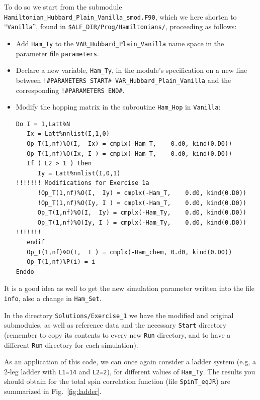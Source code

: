 \documentclass[10pt,modern]{scrartcl}
\numberwithin{exerciseitem}{exercise} %
\begin{document}
To do so we start from the submodule \texttt{Hamiltonian\_Hubbard\_Plain\_Vanilla\_smod.F90}, which we here shorten to ``\texttt{Vanilla}'', found in \texttt{\$ALF\_DIR/Prog/Hamiltonians/}, proceeding as follows: 
\begin{itemize}
	\item Add \texttt{Ham\_Ty} to the \texttt{VAR\_Hubbard\_Plain\_Vanilla} name space in the parameter file \texttt{parameters}.
	\item Declare a new variable, \texttt{Ham\_Ty}, in the module's specification on a new line between \verb|!#PARAMETERS START# VAR_Hubbard_Plain_Vanilla| and the corresponding \verb|!#PARAMETERS END#|.
	\item Modify the hopping matrix in the subroutine \texttt{Ham\_Hop} in \texttt{Vanilla}:
\begin{lstlisting}[style=fortran]
Do I = 1,Latt%N
   Ix = Latt%nnlist(I,1,0)
   Op_T(1,nf)%O(I,  Ix) = cmplx(-Ham_T,    0.d0, kind(0.D0))
   Op_T(1,nf)%O(Ix, I ) = cmplx(-Ham_T,    0.d0, kind(0.D0))
   If ( L2 > 1 ) then
      Iy = Latt%nnlist(I,0,1)
!!!!!!! Modifications for Exercise 1a
      !Op_T(1,nf)%O(I,  Iy) = cmplx(-Ham_T,    0.d0, kind(0.D0))
      !Op_T(1,nf)%O(Iy, I ) = cmplx(-Ham_T,    0.d0, kind(0.D0))
      Op_T(1,nf)%O(I,  Iy) = cmplx(-Ham_Ty,    0.d0, kind(0.D0))
      Op_T(1,nf)%O(Iy, I ) = cmplx(-Ham_Ty,    0.d0, kind(0.D0))
!!!!!!!
   endif
   Op_T(1,nf)%O(I,  I ) = cmplx(-Ham_chem, 0.d0, kind(0.D0))
   Op_T(1,nf)%P(i) = i 
Enddo
\end{lstlisting} 
\end{itemize}
It is a good idea as well to get the new simulation parameter written into the file \texttt{info}, also a change in \texttt{Ham\_Set}.

In the directory \texttt{Solutions/Exercise\_1} we have the modified and original submodules, as well as reference data and the necessary \texttt{Start} directory (remember to copy its contents to every new \texttt{Run} directory, and to have a different \texttt{Run} directory for each simulation).

As an application of this code, we can once again consider a ladder system (e.g, a 2-leg ladder with \texttt{L1=14} and \texttt{L2=2}), for different values of \texttt{Ham\_Ty}. The results you should obtain for the total spin correlation function (file \texttt{SpinT\_eqJR}) are summarized in Fig.~\ref{fig:ladder}.
\end{document}
